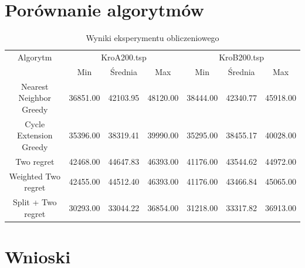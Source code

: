 \documentclass[11pt]{article}
\begin{document}
\section{Porównanie algorytmów}\label{sec:porównanie-algorytmów}
\begin{table}[H]
    \centering
    \begin{tabular}{|c||c|c|c||c|c|c|}
        \hline
        Algorytm & \multicolumn{3}{c||}{KroA200.tsp} & \multicolumn{3}{c|}{KroB200.tsp} \\
        \cline{2-4} \cline{5-7}
        & Min & Średnia & Max & Min & Średnia & Max   \\
        \hline
        Nearest Neighbor Greedy & 36851.00 & 42103.95 & 48120.00 & 38444.00 & 42340.77 & 45918.00 \\
        \hline
        Cycle Extension Greedy & 35396.00 & 38319.41 & 39990.00 & 35295.00 & 38455.17 & 40028.00 \\
        \hline
        Two regret & 42468.00 & 44647.83 & 46393.00 & 41176.00 & 43544.62 & 44972.00 \\
        \hline
        Weighted Two regret & 42455.00 & 44512.40 & 46393.00 & 41176.00 & 43466.84 & 45065.00 \\
        \hline
        Split + Two regret & 30293.00 & 33044.22 & 36854.00 & 31218.00 & 33317.82 & 36913.00 \\
        \hline
    \end{tabular}
    \caption{Wyniki eksperymentu obliczeniowego}
    \label{tab:wyniki-eksperymentu}
\end{table}

\section{Wnioski}\label{sec:wnioski}
\end{document}
